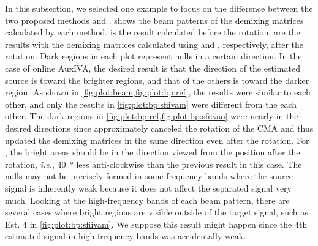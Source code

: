 \documentclass[sip,biber]{now-journal}
\begin{document}
In this subsection, we selected one example to focus on the difference between the two proposed methods \SFIIVAo{} and \SFIIVAm{}.
 shows the beam patterns of the demixing matrices calculated by each method.
 is the result calculated before the rotation.
 are the results with the demixing matrices calculated using \SFIIVAo{} and \SFIIVAm{}, respectively, after the rotation.
Dark regions in each plot represent nulls in a certain direction.
In the case of online AuxIVA, the desired result is that the direction of the estimated source is toward the brighter regions, and that of the others is toward the darker region.
As shown in \cref{fig:plot:beam,fig:plot:bp:ref}, the results were similar to each other, and only the results in \cref{fig:plot:bp:sfiivam} were different from the each other.
The dark regions in \cref{fig:plot:bp:ref,fig:plot:bp:sfiivao} were nearly in the desired directions since \SFIIVAo{} approximately canceled the rotation of the CMA and thus updated the demixing matrices in the same direction even after the rotation.
For \SFIIVAm{}, the bright areas should be in the direction viewed from the position after the rotation, \emph{i.e.}, \SI{40}{\degree} less anti-clockwise than the previous result in this case.
The nulls may not be precisely formed in some frequency bands where the source signal is inherently weak because it does not affect the separated signal very much.
Looking at the high-frequency bands of each beam pattern, there are several cases where bright regions are visible outside of the target signal, such as Est. 4 in \cref{fig:plot:bp:sfiivam}.
We suppose this result might happen since the 4th estimated signal in high-frequency bands was accidentally weak.
\end{document}
